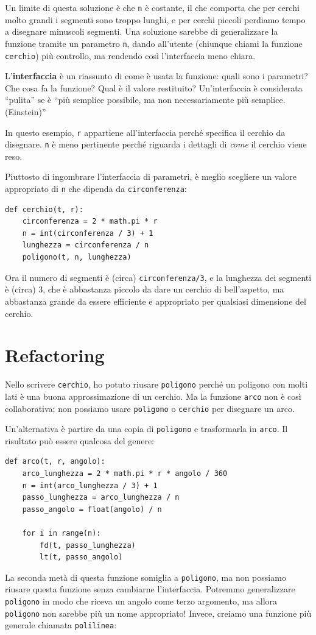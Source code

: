 \documentclass[10pt]{book}
\begin{document}
Un limite di questa soluzione è che {\tt n} è costante, il che comporta che per cerchi molto grandi i segmenti sono troppo lunghi, e per cerchi piccoli perdiamo tempo a disegnare minuscoli segmenti. Una soluzione sarebbe di generalizzare la funzione tramite un parametro {\tt n}, dando all'utente (chiunque chiami la funzione {\tt cerchio}) più controllo, ma rendendo così l'interfaccia meno chiara.

L'{\bf interfaccia} è un riassunto di come è usata la funzione: quali sono i parametri? Che cosa fa la funzione? Qual è il valore restituito? Un'interfaccia è considerata ``pulita'' se è ``più semplice possibile, ma non necessariamente più semplice. (Einstein)''

In questo esempio, {\tt r} appartiene all'interfaccia perché specifica il cerchio da disegnare. {\tt n} è meno pertinente perché riguarda i dettagli di {\em come} il cerchio viene reso.

Piuttosto di ingombrare l'interfaccia di parametri, è meglio scegliere un valore appropriato di {\tt n} che dipenda da {\tt circonferenza}:

\begin{verbatim}
def cerchio(t, r):
    circonferenza = 2 * math.pi * r
    n = int(circonferenza / 3) + 1
    lunghezza = circonferenza / n
    poligono(t, n, lunghezza)
\end{verbatim}
%
Ora il numero di segmenti è (circa) {\tt circonferenza/3}, e la lunghezza dei segmenti è (circa) 3, che è abbastanza piccolo da dare un cerchio di bell'aspetto, ma abbastanza grande da essere efficiente e appropriato per qualsiasi dimensione del cerchio.


\section{Refactoring}
\label{refactoring}

Nello scrivere {\tt cerchio}, ho potuto riusare {\tt poligono}
perché un poligono con molti lati è una buona approssimazione di un cerchio. Ma la funzione {\tt arco} non è così collaborativa; non possiamo usare {\tt poligono}
o {\tt cerchio} per disegnare un arco.

Un'alternativa è partire da una copia di {\tt poligono} e trasformarla in {\tt arco}. Il risultato può essere qualcosa del genere:

\begin{verbatim}
def arco(t, r, angolo):
    arco_lunghezza = 2 * math.pi * r * angolo / 360
    n = int(arco_lunghezza / 3) + 1
    passo_lunghezza = arco_lunghezza / n
    passo_angolo = float(angolo) / n
    
    for i in range(n):
        fd(t, passo_lunghezza)
        lt(t, passo_angolo)
\end{verbatim}
%
La seconda metà di questa funzione somiglia a {\tt poligono}, ma non possiamo riusare questa funzione senza cambiarne l'interfaccia. Potremmo generalizzare {\tt poligono} in modo che riceva un angolo come terzo argomento, ma allora {\tt poligono} non sarebbe più un nome appropriato! Invece, creiamo una funzione più generale chiamata {\tt polilinea}:
\end{document}
